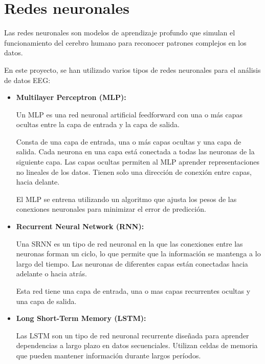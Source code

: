 \section{Redes neuronales}

	
	
Las redes neuronales son modelos de aprendizaje profundo que simulan el funcionamiento del cerebro humano para reconocer patrones complejos en los datos.

En este proyecto, se han utilizado varios tipos de redes neuronales para el análisis de datos EEG:		
	
\begin{itemize}

	\item
	\textbf{Multilayer Perceptron (MLP):}

	Un MLP es una red neuronal artificial feedforward con una o más capas ocultas entre la capa de entrada y la capa de salida.
	
	Consta de una capa de entrada, una o más capas ocultas y una capa de salida. Cada neurona en una capa está conectada a todas las neuronas de la siguiente capa. Las capas ocultas permiten al MLP aprender representaciones no lineales de los datos. Tienen solo una dirección de conexión entre capas, hacia delante.
	
	El MLP se entrena utilizando un algoritmo que ajusta los pesos de las conexiones neuronales para minimizar el error de predicción.
	
	

	

	\item
	\textbf{Recurrent Neural Network (RNN):}

	Una SRNN es un tipo de red neuronal en la que las conexiones entre las neuronas forman un ciclo, lo que permite que la información se mantenga a lo largo del tiempo.  Las neuronas de diferentes capas están conectadas hacia adelante o hacia atrás.

	Esta red tiene una capa de entrada, una o mas capas recurrentes ocultas y una capa de salida.
	
	



	\item
	\textbf{Long Short-Term Memory (LSTM):}

	Las LSTM son un tipo de red neuronal recurrente diseñada para aprender dependencias a largo plazo en datos secuenciales. Utilizan celdas de memoria que pueden mantener información durante largos períodos.
	

\end{itemize}

